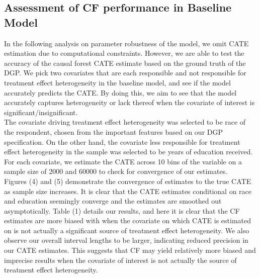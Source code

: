 \documentclass[12pt]{article}
\begin{document}
\subsection{Assessment of CF performance in Baseline Model} 
In the following analysis on parameter robustness of the model, we omit CATE estimation due to computational constraints. However, we are able to test the accuracy of the causal forest CATE estimate based on the ground truth of the DGP. We pick two covariates that are each responsible and not responsible for treatment effect heterogeneity in the baseline model, and see if the model accurately predicts the CATE. By doing this, we aim to see that the model accurately captures heterogeneity or lack thereof when the covariate of interest is significant/insignificant. \\

The  covariate driving treatment effect heterogeneity was selected to be race of the respondent, chosen from the important features based on our DGP specification. On the other hand, the covariate less responsible for treatment effect heterogeneity in the sample was selected to be years of education received. For each covariate, we estimate the CATE across 10 bins of the variable on a sample size of 2000 and 60000 to check for convergence of our estimates. \\ 

Figures (4) and (5) demonstrate the convergence of estimates to the true CATE as sample size increases. It is clear that the CATE estimates conditional on race and education seemingly converge and the estimates are smoothed out asymptotically. Table (1) details our results, and here it is clear that the CF estimates are more biased with when the covariate on which CATE is estimated on is not actually a significant source of treatment effect heterogeneity. We also observe our overall interval lengths to be larger, indicating reduced precision in our CATE estimates. This suggests that CF may yield relatively more biased and imprecise results when the covariate of interest is not actually the source of treatment effect heterogeneity. \\ 
\end{document}
